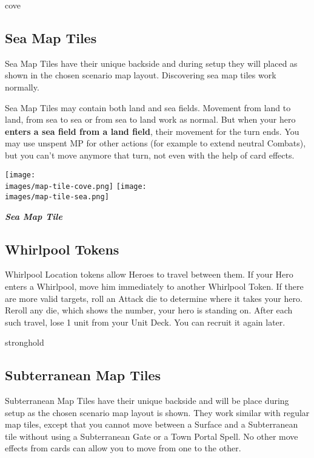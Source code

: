 \begin{multicols*}{2}
\begin{expansion}{cove}
\subsection*{Sea Map Tiles}
Sea Map Tiles have their unique backside and during setup they will placed as shown in the chosen scenario map layout. Discovering sea map tiles work normally.\par
Sea Map Tiles may contain both land and sea fields. Movement from land to land, from sea to sea or from sea to land work as normal. But when your hero \textbf{enters a sea field from a land field}, their movement for the turn ends. You may use unspent MP for other actions (for example to extend neutral Combats), but you can't move anymore that turn, not even with the help of card effects.

\bigskip
\begin{multicols*}{2}
\hspace{-0.5em}\texttt{[image: \\images/map-tile-cove.png]}
\columnbreak
\hspace{-0.5em}\texttt{[image: \\images/map-tile-sea.png]}
\end{multicols*}
\medskip
\begin{center}
  \footnotesize{\textbf{\textit{\textcolor{darkcandyapplered}{Sea Map Tile}}}}
\end{center}
\medskip

\subsection*{Whirlpool Tokens}

Whirlpool Location tokens allow Heroes to travel between them. If your Hero enters a Whirlpool, move him immediately to another Whirlpool Token. If there are more valid targets, roll an Attack die to determine where it takes your hero. Reroll any die, which shows the number, your hero is standing on. After each such travel, lose 1 unit from your Unit Deck. You can recruit it again later. %
\end{expansion}

\begin{expansion}{stronghold}

\subsection*{Subterranean Map Tiles}

Subterranean Map Tiles have their unique backside and will be place during setup as the chosen scenario map layout is shown. They work similar with regular map tiles, except that you cannot move between a Surface and a Subterranean tile without using a Subterranean Gate or a Town Portal Spell. No other move effects from cards can allow you to move from one to the other. %


\end{expansion}
\end{multicols*}
